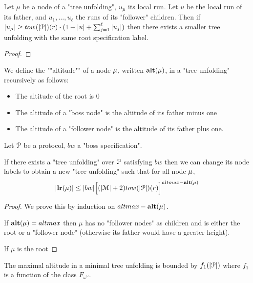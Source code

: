\begin{lemma}
	Let $\mu$ be a node of a "tree unfolding", $u_\mu$ its local run.
	Let $u$ be the local run of its father, and $u_1, \ldots, u_\ell$ the runs of its "follower" children.
	Then if $\size{u_\mu} \geq \towerfun(\size{\prot})(r) \cdot (1+ \size{u}+ \sum_{j=1}^{\ell} \size{u_j})$ then there exists a smaller tree unfolding with the same root specification label.
\end{lemma}

\ifproofs
\begin{proof}
\end{proof}
\fi

\begin{definition}
	We define the ""altitude"" of a node $\mu$, written $\mathbf{alt(\mu)}$, in a "tree unfolding" recursively as follows:
	\begin{itemize}
		\item The altitude of the root is $0$
		
		\item The altitude of a "boss node" is the altitude of its father minus one
		
		\item The altitude of a "follower node" is the altitude of its father plus one.
	\end{itemize}
\end{definition}

\begin{lemma}
	\label{lem:bound-length-at-height-h}
	Let $\mathcal{P}$ be a protocol, $bw$ a "boss specification".
	 
	If there exists a "tree unfolding" over $\mathcal{P}$ satisfying $bw$ then we can change its node labels to obtain a new "tree unfolding" such that for all node $\mu$, 
	\[
		\size{\localrunlabel{\node}} \leq \size{bw} \Big[(\size{\messages}+2) \towerfun(\size{\prot})(r)\Big]^{altmax-\altitude{\node}}
	\] 
\end{lemma}

\ifproofs
\begin{proof}
	We prove this by induction on $altmax-\mathbf{alt(\mu)}$.
	
	If $\mathbf{alt(\mu)} = altmax$ then $\mu$ has no "follower nodes" as children and is either the root or a "follower node" (otherwise its father would have a greater height).
	
	If $\mu$ is the root 
\end{proof}
\fi

\begin{lemma}
	\label{lem:bound-max-height}
	The maximal altitude in a minimal tree unfolding is bounded by $f_1(|\mathcal{P}|)$ where $f_1$ is a function of the class $F_{\omega^\omega}$.
\end{lemma}

